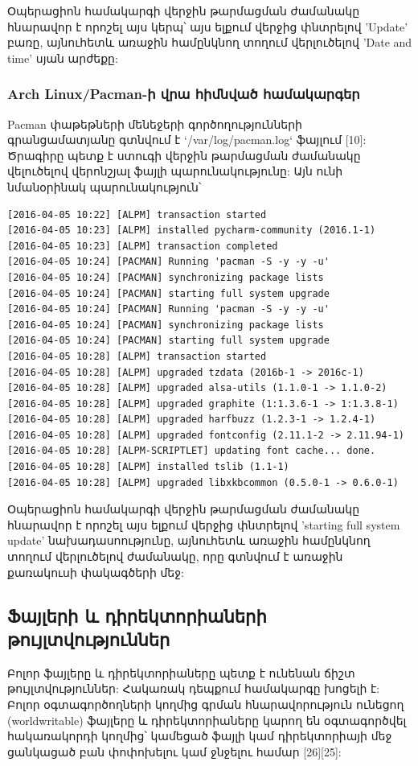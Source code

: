 \documentclass[a4paper,12pt]{article}
\begin{document}
\begin{sloppypar}
Օպերացիոն համակարգի վերջին թարմացման ժամանակը հնարավոր է որոշել այս կերպ՝
այս ելքում վերջից փնտրելով 'Update' բառը, այնուհետև
առաջին համընկնող տողում վերլուծելով 'Date and time' սյան արժեքը:

\subsubsection{Arch Linux/Pacman-ի վրա հիմնված համակարգեր}

Pacman փաթեթների մենեջերի գործողությունների գրանցամատյանը
գտնվում է `/var/log/pacman.log` ֆայլում [10]: Ծրագիրը պետք է ստուգի
վերջին թարմացման ժամանակը վելուծելով վերոնշյալ ֆայլի պարունակությունը:
Այն ունի նմանօրինակ պարունակություն՝

\begin{lstlisting}[language={}]
[2016-04-05 10:22] [ALPM] transaction started
[2016-04-05 10:23] [ALPM] installed pycharm-community (2016.1-1)
[2016-04-05 10:23] [ALPM] transaction completed
[2016-04-05 10:24] [PACMAN] Running 'pacman -S -y -y -u'
[2016-04-05 10:24] [PACMAN] synchronizing package lists
[2016-04-05 10:24] [PACMAN] starting full system upgrade
[2016-04-05 10:24] [PACMAN] Running 'pacman -S -y -y -u'
[2016-04-05 10:24] [PACMAN] synchronizing package lists
[2016-04-05 10:24] [PACMAN] starting full system upgrade
[2016-04-05 10:28] [ALPM] transaction started
[2016-04-05 10:28] [ALPM] upgraded tzdata (2016b-1 -> 2016c-1)
[2016-04-05 10:28] [ALPM] upgraded alsa-utils (1.1.0-1 -> 1.1.0-2)
[2016-04-05 10:28] [ALPM] upgraded graphite (1:1.3.6-1 -> 1:1.3.8-1)
[2016-04-05 10:28] [ALPM] upgraded harfbuzz (1.2.3-1 -> 1.2.4-1)
[2016-04-05 10:28] [ALPM] upgraded fontconfig (2.11.1-2 -> 2.11.94-1)
[2016-04-05 10:28] [ALPM-SCRIPTLET] updating font cache... done.
[2016-04-05 10:28] [ALPM] installed tslib (1.1-1)
[2016-04-05 10:28] [ALPM] upgraded libxkbcommon (0.5.0-1 -> 0.6.0-1)
\end{lstlisting}

Օպերացիոն համակարգի վերջին թարմացման ժամանակը հնարավոր է որոշել
այս ելքում վերջից փնտրելով 'starting full system update' նախադասոությունը,
այնուհետև առաջին համընկնող տողում վերլուծելով ժամանակը, որը գտնվում է
առաջին քառակուսի փակագծերի մեջ:


\subsection{Ֆայլերի և դիրեկտորիաների թույլտվություններ}


Բոլոր ֆայլերը և դիրեկտորիաները պետք է ունենան ճիշտ թույլտվություններ:
Հակառակ դեպքում համակարգը խոցելի է:
Բոլոր օգտագործողների կողմից գրման հնարավորություն ունեցող (worldwritable)
ֆայլերը և դիրեկտորիաները կարող են օգտագործվել հակառակորդի կողմից՝
կամեցած ֆայլի կամ դիրեկտորիայի մեջ ցանկացած բան փոփոխելու կամ ջնջելու
համար [26][25]:


\end{sloppypar}
\end{document}
